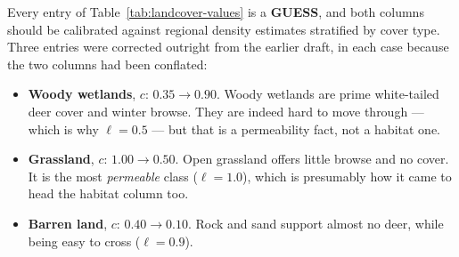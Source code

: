 \documentclass[11pt]{article}
\newcommand{\tagGUESS}{{\footnotesize\textsf{\textbf{\textcolor{red!70!black}{GUESS}}}}}
\begin{document}
Every entry of Table~\ref{tab:landcover-values} is a \tagGUESS{}, and both columns should be calibrated against regional density estimates stratified by cover type. Three entries were corrected outright from the earlier draft, in each case because the two columns had been conflated:
\begin{itemize}
\item \textbf{Woody wetlands}, $c$: $0.35 \to 0.90$. Woody wetlands are prime white-tailed deer cover and winter browse. They are indeed hard to move through --- which is why $\ell = 0.5$ --- but that is a permeability fact, not a habitat one.
\item \textbf{Grassland}, $c$: $1.00 \to 0.50$. Open grassland offers little browse and no cover. It is the most \emph{permeable} class ($\ell = 1.0$), which is presumably how it came to head the habitat column too.
\item \textbf{Barren land}, $c$: $0.40 \to 0.10$. Rock and sand support almost no deer, while being easy to cross ($\ell = 0.9$).
\end{itemize}
\end{document}
